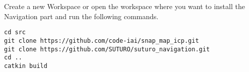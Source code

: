 \documentclass[main.tex]{subfiles}
\begin{document}
Create a new Workspace or open the workspace where you want to install the Navigation part and run the following commands.	
\begin{lstlisting}
cd src
git clone https://github.com/code-iai/snap_map_icp.git
git clone https://github.com/SUTURO/suturo_navigation.git
cd ..
catkin build  \end{lstlisting}
\end{document}
